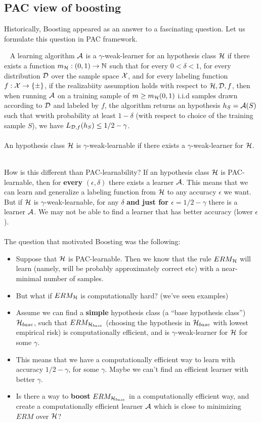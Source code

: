 \subsection{PAC view of boosting}


Historically, Boosting appeared as an answer to a fascinating question. Let us
formulate this question in PAC framework.

\begin{definition}  ~
A learning algorithm $\mathcal{A}$ is
a $\gamma$-weak-learner for an hypothesis class $\mathcal{H}$ 
if there exists a function $m_{\mathcal{H}}:(0,1)\to\mathbb{N}$ such that for every
$0<\delta<1$, for every distribution $\mathcal{D}$ over the sample space $\mathcal{X}$, and for
every labeling function $f:\mathcal{X}\to\left\{ \pm \right\}$, if the realizabiity
assumption holds with respect to $\mathcal{H},\mathcal{D},f$, then when running $\mathcal{A}$ on a
training sample of $m\geq m_{\mathcal{H}}(0,1)$ i.i.d samples drawn according to $\mathcal{D}$ and
labeled by $f$, the algorithm returns an hypothesis $h_S=\mathcal{A}(S)$ such that wwith
probability at least $1-\delta$ (with respect to choice of the training sample
$S$), we have $L_{\mathcal{D},f} (h_S) \leq 1/2-\gamma$. 
\\~\\
An hypothesis class $\mathcal{H}$ is $\gamma$-weak-learnable if there exists a
$\gamma$-weak-learner for $\mathcal{H}$. 
\end{definition}
~\\
How is this different than PAC-learnability? If an hypothesis class $\mathcal{H}$ 
is PAC-learnable, then for {\bf every} $(\epsilon,\delta)$ there exists a
learner $\mathcal{A}$. This means that we can learn and generalize a labeling function
from $\mathcal{H}$ to any accuracy $\epsilon$ we want. But if $\mathcal{H}$ is
$\gamma$-weak-learnable, for any $\delta$ {\bf and just for
$\epsilon=1/2-\gamma$}
there is a learner $\mathcal{A}$.
We may not be able to find a learner that has better
accuracy (lower
$\epsilon$). 
\\~\\
The question that motivated Boosting was the following: 
\begin{itemize}
  \item Suppose that $\mathcal{H}$ is PAC-learnable. Then we know that the rule
    $ERM_{\mathcal{H}}$ will learn (namely, will be probably approximately correct etc)
    with a near-minimal number of samples.
  \item But what if $ERM_{\mathcal{H}}$ is computationally hard? (we've seen examples)
  \item Assume we can find a {\bf simple} hypothesis class (a ``base hypothesis class'')
    $\mathcal{H}_{base}$, such that $ERM_{\mathcal{H}_{base}}$ 
    (choosing the hypothesis in $\mathcal{H}_{base}$ with lowest empirical risk) is
    computationally efficient, and is
    $\gamma$-weak-learner for $\mathcal{H}$ for some $\gamma$.
  \item This means that we have a computationally efficient way to learn with
    accuracy $1/2-\gamma$, for some $\gamma$. Maybe we can't 
    find an efficient learner with better $\gamma$.
  \item Is there a way to {\bf boost} $ERM_{\mathcal{H}_{base}}$ in a computationally
    efficient way, 
  and create a computationally efficient learner $\mathcal{A}$ 
  which is close to minimizing $ERM$ over $\mathcal{H}$?
\end{itemize}
